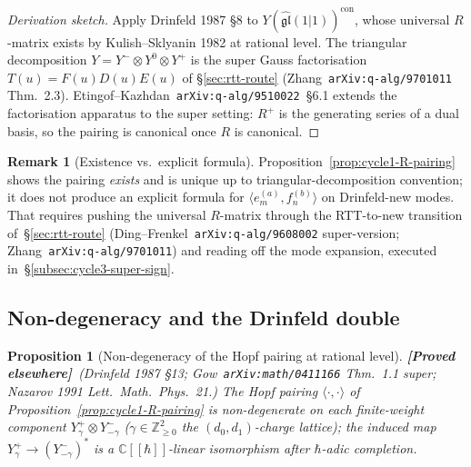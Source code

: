 \documentclass[11pt]{amsart}
\newtheorem{proposition}[theorem]{Proposition}
\theoremstyle{definition}
\newtheorem{remark}[theorem]{Remark}
\providecommand{\bZ}{\mathbb{Z}}
\providecommand{\bC}{\mathbb{C}}
\providecommand{\fgl}{\mathfrak{gl}}
\providecommand{\ClaimStatusProvedElsewhere}{\textbf{\textsf{[Proved elsewhere]}}}
\begin{document}
\begin{proof}[Derivation sketch]
Apply Drinfeld 1987 \S8 to $Y(\widehat{\fgl}(1|1))^{\mathrm{con}}$, whose
universal $R$-matrix exists by Kulish--Sklyanin 1982 at rational level.
The triangular decomposition $Y = Y^- \otimes Y^0 \otimes Y^+$ is the
super Gauss factorisation $T(u) = F(u) D(u) E(u)$ of
\S\ref{sec:rtt-route} (Zhang~\texttt{arXiv:q-alg/9701011} Thm.~2.3).
Etingof--Kazhdan~\texttt{arXiv:q-alg/9510022}~\S6.1 extends the
factorisation apparatus to the super setting: $R^+$ is the generating
series of a dual basis, so the pairing is canonical once $R$ is canonical.
\end{proof}

\begin{remark}[Existence vs.\ explicit formula]
\label{rem:cycle1-not-formula}
Proposition~\ref{prop:cycle1-R-pairing} shows the pairing \emph{exists}
and is unique up to triangular-decomposition convention; it does not
produce an explicit formula for $\langle e^{(a)}_m, f^{(b)}_n\rangle$ on
Drinfeld-new modes. That requires pushing the universal $R$-matrix
through the RTT-to-new transition of~\S\ref{sec:rtt-route}
(Ding--Frenkel~\texttt{arXiv:q-alg/9608002} super-version;
Zhang~\texttt{arXiv:q-alg/9701011}) and reading off the mode expansion,
executed in~\S\ref{subsec:cycle3-super-sign}.
\end{remark}

\subsection{Non-degeneracy and the Drinfeld double}
\label{subsec:cycle2-nondegeneracy}

\begin{proposition}[Non-degeneracy of the Hopf pairing at rational level]
\label{prop:cycle2-nondegeneracy}
\ClaimStatusProvedElsewhere\
\emph{(Drinfeld 1987 \S13; Gow~\texttt{arXiv:math/0411166} Thm.~1.1 super;
Nazarov 1991 \emph{Lett.~Math.~Phys.}~21.)}
The Hopf pairing $\langle \cdot, \cdot \rangle$ of
Proposition~\ref{prop:cycle1-R-pairing} is non-degenerate on each
finite-weight component $Y^+_\gamma \otimes Y^-_{-\gamma}$
($\gamma \in \bZ_{\geq 0}^2$ the $(d_0, d_1)$-charge lattice); the induced
map $Y^+_\gamma \to (Y^-_{-\gamma})^*$ is a $\bC[[\hbar]]$-linear
isomorphism after $\hbar$-adic completion.
\end{proposition}
\end{document}

